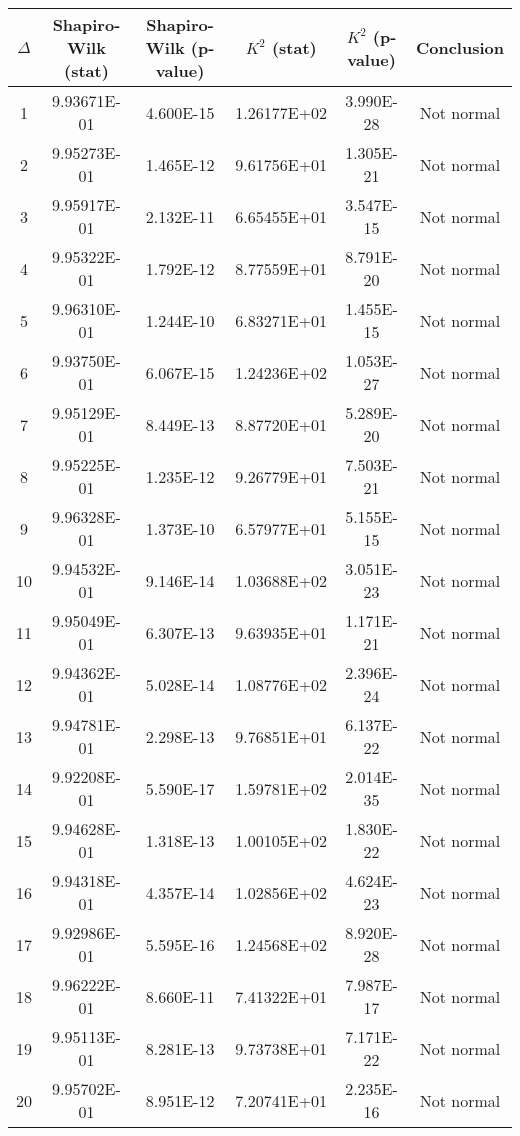 \begin{table}[h]
	\begin{tabular}{|c|c|c|c|c|c|}
		\hline
		$\Delta$ &  Shapiro-Wilk (stat) & Shapiro-Wilk (p-value) & $K^2$ (stat) & $K^2$ (p-value) & Conclusion\\\hline
		\hline
		1 & 9.93671E-01 & 4.600E-15 & 1.26177E+02 & 3.990E-28 & Not normal\\\hline
		2 & 9.95273E-01 & 1.465E-12 & 9.61756E+01 & 1.305E-21 & Not normal\\\hline
		3 & 9.95917E-01 & 2.132E-11 & 6.65455E+01 & 3.547E-15 & Not normal\\\hline
		4 & 9.95322E-01 & 1.792E-12 & 8.77559E+01 & 8.791E-20 & Not normal\\\hline
		5 & 9.96310E-01 & 1.244E-10 & 6.83271E+01 & 1.455E-15 & Not normal\\\hline
		6 & 9.93750E-01 & 6.067E-15 & 1.24236E+02 & 1.053E-27 & Not normal\\\hline
		7 & 9.95129E-01 & 8.449E-13 & 8.87720E+01 & 5.289E-20 & Not normal\\\hline
		8 & 9.95225E-01 & 1.235E-12 & 9.26779E+01 & 7.503E-21 & Not normal\\\hline
		9 & 9.96328E-01 & 1.373E-10 & 6.57977E+01 & 5.155E-15 & Not normal\\\hline
		10 & 9.94532E-01 & 9.146E-14 & 1.03688E+02 & 3.051E-23 & Not normal\\\hline
		11 & 9.95049E-01 & 6.307E-13 & 9.63935E+01 & 1.171E-21 & Not normal\\\hline
		12 & 9.94362E-01 & 5.028E-14 & 1.08776E+02 & 2.396E-24 & Not normal\\\hline
		13 & 9.94781E-01 & 2.298E-13 & 9.76851E+01 & 6.137E-22 & Not normal\\\hline
		14 & 9.92208E-01 & 5.590E-17 & 1.59781E+02 & 2.014E-35 & Not normal\\\hline
		15 & 9.94628E-01 & 1.318E-13 & 1.00105E+02 & 1.830E-22 & Not normal\\\hline
		16 & 9.94318E-01 & 4.357E-14 & 1.02856E+02 & 4.624E-23 & Not normal\\\hline
		17 & 9.92986E-01 & 5.595E-16 & 1.24568E+02 & 8.920E-28 & Not normal\\\hline
		18 & 9.96222E-01 & 8.660E-11 & 7.41322E+01 & 7.987E-17 & Not normal\\\hline
		19 & 9.95113E-01 & 8.281E-13 & 9.73738E+01 & 7.171E-22 & Not normal\\\hline
		20 & 9.95702E-01 & 8.951E-12 & 7.20741E+01 & 2.235E-16 & Not normal\\\hline

\end{tabular}
\end{table}
